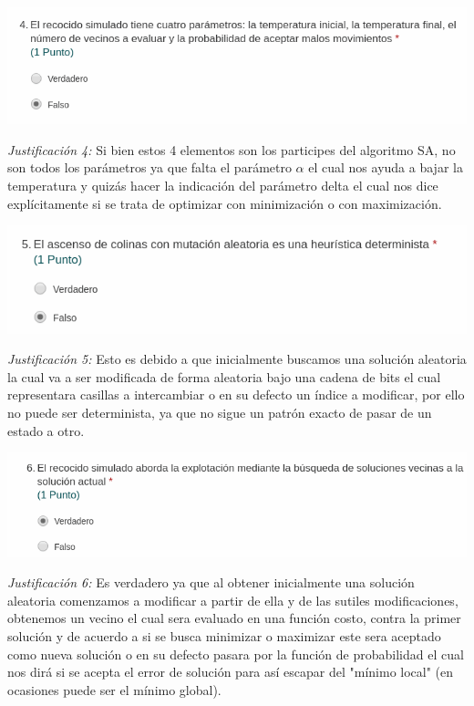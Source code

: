 \documentclass[10pt]{article}
\begin{document}
\begin{center}
  \includegraphics[scale=0.5]{img/p4.png}
\end{center}
\textit{Justificación 4: }Si bien estos 4 elementos son los participes del algoritmo SA, no son todos los parámetros ya que falta el parámetro $\alpha$ el cual nos ayuda a bajar la temperatura y quizás hacer la indicación del parámetro delta el cual nos dice explícitamente si se trata de optimizar con minimización o con maximización.\\

\begin{center}
  \includegraphics[scale=0.5]{img/p5.png}
\end{center}
\textit{Justificación 5: } Esto es debido a que inicialmente buscamos una solución aleatoria la cual va a ser modificada de forma aleatoria bajo una cadena de bits el cual representara casillas a intercambiar o en su defecto un índice a modificar, por ello no puede ser determinista, ya que no sigue un patrón exacto de pasar de un estado a otro.\\

\begin{center}
  \includegraphics[scale=0.5]{img/p6.png}
\end{center}
\textit{Justificación 6: }Es verdadero ya que al obtener inicialmente una solución aleatoria comenzamos a modificar a partir de ella y de las sutiles modificaciones, obtenemos un vecino el cual sera evaluado en una función costo, contra la primer solución y de acuerdo a si se busca minimizar o maximizar este sera aceptado como nueva solución o en su defecto pasara por la función de probabilidad el cual nos dirá si se acepta el error de solución para así escapar del "mínimo local" (en ocasiones puede ser el mínimo global).\\
\end{document}
